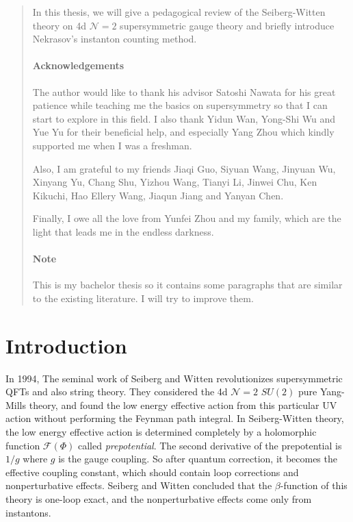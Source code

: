\documentclass{article}
\begin{document}
\begin{abstract}
In this thesis, we will give a pedagogical review of the Seiberg-Witten theory on 4d $\mathcal{N}=2$ supersymmetric gauge theory and briefly introduce Nekrasov's instanton counting method.

\paragraph{Acknowledgements} 
The author would like to thank his advisor Satoshi Nawata for his great patience while teaching me the basics on supersymmetry so that I can start to explore in this field. I also thank Yidun Wan, Yong-Shi Wu and Yue Yu for their beneficial help, and especially Yang Zhou which kindly supported me when I was a freshman.

Also, I am grateful to my friends Jiaqi Guo, Siyuan Wang, Jinyuan Wu, Xinyang Yu, Chang Shu, Yizhou Wang, Tianyi Li, Jinwei Chu, Ken Kikuchi, Hao Ellery Wang, Jiaqun Jiang and Yanyan Chen.

Finally, I owe all the love from Yunfei Zhou and my family, which are the light that leads me in the endless darkness.

\paragraph{Note} This is my bachelor thesis so it contains some paragraphs that are similar to the existing literature. I will try to improve them.

\end{abstract}



\newpage

\section{Introduction}
In 1994, The seminal work of Seiberg and Witten \cite{Sei94,Seiberg:1994aj} revolutionizes supersymmetric QFTs and also string theory. They considered the 4d $\mathcal{N}=2$ $SU(2)$ pure Yang-Mills theory, and found the low energy effective action from this particular UV action without performing the Feynman path integral. In Seiberg-Witten theory, the low energy effective action is determined completely by a holomorphic function $\mathscr{F}(\Phi)$ called \textit{prepotential}. The second derivative of the prepotential is $1/g$ where $g$ is the gauge coupling. So after quantum correction, it becomes the effective coupling constant, which should contain loop corrections and nonperturbative effects. Seiberg and Witten concluded that the $\beta$-function of this theory is one-loop exact, and the nonperturbative effects come only from instantons. 
\end{document}
